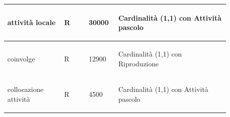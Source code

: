 \documentclass[12pt,a4paper]{article}
\begin{document}
\begin{center}
\begin{longtable}{|p{0.23\linewidth}|p{0.1\linewidth}|p{0.11\linewidth}|p{0.45\linewidth}|}
\hline
%
attività locale 				& \begin{center}
\vspace{-25pt}R
\end{center}
					& \begin{center}
					\vspace{-25pt}30000\end{center}
					& \begin{flushleft}\vspace{-25pt} Cardinalità (1,1) con Attività pascolo \end{flushleft}\\ 

\hline
coinvolge 				& \begin{center}
\vspace{-25pt}R
\end{center}
					& \begin{center}
					\vspace{-25pt}12900\end{center}
					& \begin{flushleft}\vspace{-25pt} Cardinalità (1,1) con Riproduzione \end{flushleft}\\ 

\hline
collocazione attività 				& \begin{center}
\vspace{-25pt}R
\end{center}
					& \begin{center}
					\vspace{-25pt}4500\end{center}
					& \begin{flushleft}\vspace{-25pt} Cardinalità (1,1) con Attività pascolo \end{flushleft}\\ 


\end{longtable}
\end{center}
\end{document}
